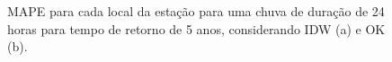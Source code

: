 \documentclass[
]{agujournal2019}
\begin{document}
\begin{figure}

\begin{minipage}{\linewidth}



\end{minipage}%
\newline
\begin{minipage}{\linewidth}



\end{minipage}%

\caption{\label{fig-Figura27}MAPE para cada local da estação para uma
chuva de duração de 24 horas para tempo de retorno de 5 anos,
considerando IDW (a) e OK (b).}

\end{figure}%
\end{document}
